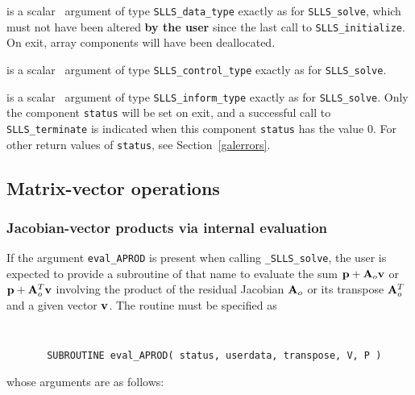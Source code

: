 \documentclass{galahad}
\newcommand{\packagename}{SLLS}
\newcommand{\fullpackagename}{\libraryname\_\packagename}
\newcommand{\solver}{{\tt \fullpackagename\_solve}}
\begin{document}
\vspace*{-3mm}
\begin{description}

 is a scalar \intentinout\ argument of type
{\tt \packagename\_data\_type}
exactly as for
{\tt \packagename\_solve},
which must not have been altered {\bf by the user} since the last call to
{\tt \packagename\_initialize}.
On exit, array components will have been deallocated.

 is a scalar \intentin\ argument of type
{\tt \packagename\_control\_type}
exactly as for
{\tt \packagename\_solve}.

 is a scalar \intentout\ argument of type
{\tt \packagename\_inform\_type}
exactly as for
{\tt \packagename\_solve}.
Only the component {\tt status} will be set on exit, and a
successful call to
{\tt \packagename\_terminate}
is indicated when this  component {\tt status} has the value 0.
For other return values of {\tt status}, see Section~\ref{galerrors}.

\end{description}



\subsection{Matrix-vector operations\label{fdv}}


\subsubsection{Jacobian-vector products via internal evaluation\label{jvp}}

If the argument {\tt eval\_APROD} is present when calling \solver, the
user is expected to provide a subroutine of that name to evaluate the
sum ${\mathbf{p}} + {\mathbf{A}}_o {\mathbf{v}}$ or ${\mathbf{p}} + {\mathbf{A}}_o^T{\mathbf{v}}$ involving the
product of the residual Jacobian ${\mathbf{A}}_o$ or its transpose ${\mathbf{A}}_o^T$
and a given vector ${\mathbf{v}}$.
The routine must be specified as

\def\baselinestretch{0.8}
{\tt
\begin{verbatim}
       SUBROUTINE eval_APROD( status, userdata, transpose, V, P )
\end{verbatim} }
\def\baselinestretch{1.0}
\noindent whose arguments are as follows:
\end{document}
